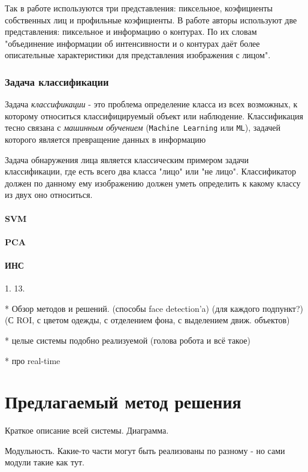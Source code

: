 \documentclass[12pt]{report}
\begin{document}
Так в работе \citep{bojkovic2006face} используются три представления: пиксельное, коэфициенты собственных лиц и профильные коэфициенты. В работе \citep{ahmadyfard2008hierarchical} авторы используют две представления: пиксельное и информацию о контурах. По их словам "объединение информации об интенсивности и о контурах даёт более описательные характеристики для представления изображения с лицом".

\subsection{Задача классификации}
\label{classficators}
Задача \emph{классификации} - это проблема определение класса из всех возможных, к которому относиться классифицируемый объект или наблюдение. Классификация тесно связана с \emph{машинным обучением} (\texttt{Machine Learning} или \texttt{ML}), задачей которого является превращение данных в информацию \citep{bradski2008learning}

Задача обнаружения лица является классическим примером задачи классификации, где есть всего два класса "лицо" или "не лицо". Классификатор должен по данному ему изображению должен уметь определить к какому классу из двух оно относиться.
\subsubsection{SVM}
\subsubsection{PCA}
\subsubsection{ИНС}
1. 13.


* Обзор методов и решений. (способы face detection’a) (для каждого подпункт?) (С ROI, с цветом одежды, с отделением фона, с выделением движ. объектов)

* целые системы подобно реализуемой (голова робота и всё такое)

* про real-time

\chapter{Предлагаемый метод решения}
\thispagestyle{fancy}

Краткое описание всей системы. Диаграмма.

Модульность. Какие-то части могут быть реализованы по разному - но сами модули такие как тут.
\end{document}

